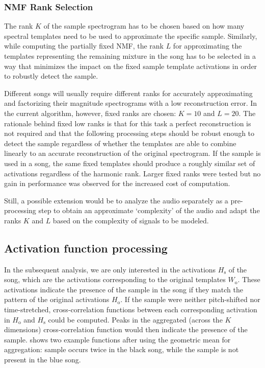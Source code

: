 \documentclass{article}
\begin{document}
\subsubsection{NMF Rank Selection}
\label{nmfrank}
The rank $K$ of the sample spectrogram has to be chosen based on how many spectral templates need to be used to approximate the specific sample. Similarly, while computing the partially fixed NMF, the rank $L$ for approximating the templates representing the remaining mixture in the song has to be selected in a way that minimizes the impact on the fixed sample template activations in order to robustly detect the sample.

Different songs will usually require different ranks for accurately approximating and factorizing their magnitude spectrograms with a low reconstruction error. In the current algorithm, however, fixed ranks are chosen: $K=10$ and $L=20$. The rationale behind fixed low ranks is that for this task a perfect reconstruction is not required and that the following processing steps should be robust enough to detect the sample regardless of whether the templates are able to combine linearly to an accurate reconstruction of  the original spectrogram. If the sample is used in a song, the same fixed templates should produce a roughly similar set of activations regardless of the harmonic rank. Larger fixed ranks were tested but no gain in performance was observed for the increased cost of computation.

Still, a possible extension would be to analyze the audio separately as a pre-processing step to obtain an approximate `complexity' of the audio and adapt the ranks $K$ and $L$ based on the complexity of signals to be modeled. 

\subsection{Activation function processing}
In the subsequent analysis, we are only interested in the activations $H_\mathrm{s}$ of the song, which are the activations corresponding to the original templates $W_\mathrm{o}$. These activations indicate the presence of the sample in the song if they match the pattern of the original activations $H_\mathrm{o}$. If the sample were neither pitch-shifted nor time-stretched, cross-correlation functions between each corresponding activation in $H_\mathrm{o}$ and $H_\mathrm{s}$ could be computed. Peaks in the aggregated (across the $K$ dimensions) cross-correlation function would then indicate the presence of the sample.  shows two example functions after using the geometric mean for aggregation: sample occurs twice in the black song, while the sample is not present in the blue song.
\end{document}
